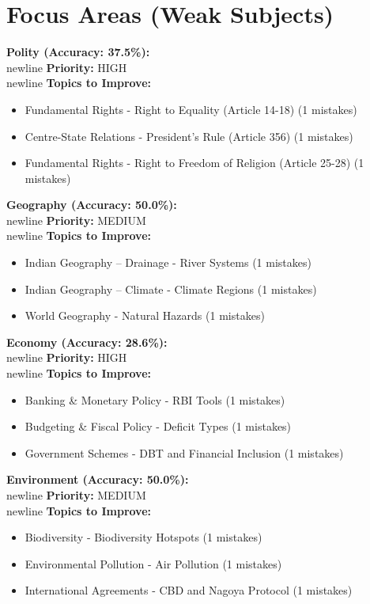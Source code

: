 \documentclass[a4paper,12pt]{article}
\begin{document}
\section{Focus Areas (Weak Subjects)}
\textbf{Polity (Accuracy: 37.5\%):}\\newline
\textbf{Priority:} \textcolor{wrongred}{HIGH}\\newline
\textbf{Topics to Improve:}\newline
\begin{itemize}
\item Fundamental Rights - Right to Equality (Article 14-18) (1 mistakes)
\item Centre-State Relations - President's Rule (Article 356) (1 mistakes)
\item Fundamental Rights - Right to Freedom of Religion (Article 25-28) (1 mistakes)
\end{itemize}
\textbf{Geography (Accuracy: 50.0\%):}\\newline
\textbf{Priority:} \textcolor{brandgold}{MEDIUM}\\newline
\textbf{Topics to Improve:}\newline
\begin{itemize}
\item Indian Geography – Drainage - River Systems (1 mistakes)
\item Indian Geography – Climate - Climate Regions (1 mistakes)
\item World Geography - Natural Hazards (1 mistakes)
\end{itemize}
\textbf{Economy (Accuracy: 28.6\%):}\\newline
\textbf{Priority:} \textcolor{wrongred}{HIGH}\\newline
\textbf{Topics to Improve:}\newline
\begin{itemize}
\item Banking \& Monetary Policy - RBI Tools (1 mistakes)
\item Budgeting \& Fiscal Policy - Deficit Types (1 mistakes)
\item Government Schemes - DBT and Financial Inclusion (1 mistakes)
\end{itemize}
\textbf{Environment (Accuracy: 50.0\%):}\\newline
\textbf{Priority:} \textcolor{brandgold}{MEDIUM}\\newline
\textbf{Topics to Improve:}\newline
\begin{itemize}
\item Biodiversity - Biodiversity Hotspots (1 mistakes)
\item Environmental Pollution - Air Pollution (1 mistakes)
\item International Agreements - CBD and Nagoya Protocol (1 mistakes)
\end{itemize}
\end{document}
